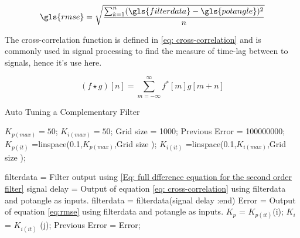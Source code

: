  \begin{equation}
 \gls{rmse} = \sqrt{\frac{\sum_{k = 1}^{n} (\gls{filterdata} -\gls{potangle})^2}{n}} \label{eq:rmse}
 \end{equation}
 
 The cross-correlation function is defined in \eqref{eq: cross-correlation} and is commonly used in signal processing to find the measure of time-lag between to signals, hence it's use here.
 
 \begin{equation}
 (f \star g)[n] = \sum_{m = -\infty}^{\infty} f^*[m]g[m+n] \label{eq: cross-correlation}
 \end{equation}

 
 
 \begin{algorithm}
 	\caption{Auto Tuning a Complementary Filter }\label{Alg: auto tune of comp filter}
 	\begin{algorithmic}[1]
 			\State$K_{p(max)} = 50$;
 			\State$K_{i(max)} = 50$;
 			\State Grid size = 1000;
 		    \State  Previous Error = 100000000;
 		    \State $K_{p(it)}$ =linspace(0.1,$K_{p(max)}$,Grid size );
  		    \State $K_{i(it)}$ =linspace(0.1,$K_{i(max)}$,Grid size );	
  		    
  		    	    
 		
 			 		\State\gls{filterdata} = Filter output using \eqref{Eq: full dfference equation for the second order filter}
 					\State signal delay = Output of equation \eqref{eq: cross-correlation} using \gls{filterdata} and \gls{potangle} as inputs.
 					\State   \gls{filterdata} = \gls{filterdata}(signal delay :end)
 					\State    Error = Output of equation \eqref{eq:rmse} using \gls{filterdata} and \gls{potangle} as inputs.
 									       \State $K_p$ = $K_{p(it)}$(i);
 									        \State $K_i$ = $K_{i(it)}$ (j);
 									        \State Previous Error = Error;
 								\EndIf
 			\EndFor
 		\EndFor
 		\State {}
 		\EndProcedure
 	\end{algorithmic}
 \end{algorithm}
